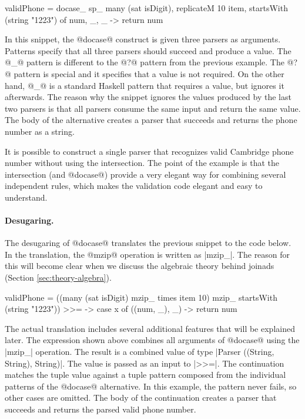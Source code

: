 \documentclass[preprint]{sigplanconf}
\begin{document}
\begin{code}
validPhone = docase_
   sp_ many (sat isDigit), 
       replicateM 10 item,
       startsWith (string "1223") of
  num, _, _ -> return num
\end{code}
In this snippet, the @docase@ construct is given three parsers as arguments. Patterns specify
that all three parsers should succeed and produce a value. The @_@ pattern is different to the
@?@ pattern from the previous example. The @?@ pattern is special and it specifies that a value
is not required. On the other hand, @_@ is a standard Haskell pattern that requires
a value, but ignores it afterwards. The reason why the snippet ignores the values produced by the
last two parsers is that all parsers consume the same input and return the same value.
The body of the alternative creates a parser that succeeds and returns the phone number as
a string.

It is possible to construct a single parser that recognizes valid Cambridge phone number without using
the intersection. The point of the example is that the intersection (and @docase@) provide a
very elegant way for combining several independent rules, which makes the validation code
elegant and easy to understand.

\paragraph{Desugaring.}
The desugaring of @docase@ translates the previous snippet to the code below. In the 
translation, the @mzip@ operation is written as |mzip_|. The reason for this will become clear
when we discuss the algebraic theory behind joinads (Section \ref{sec:theory-algebra}).

\begin{code}
validPhone = 
    ((many (sat isDigit) mzip_ times item 10) 
        mzip_ startsWith (string "1223")) >>= \x ->
            case x of ((num, _), _) -> return num
\end{code}
The actual translation includes several additional features that will be explained later.
The expression shown above combines all arguments of @docase@ using the |mzip_| operation. The 
result is a combined value of type |Parser ((String, String), String)|. The value is passed
as an input to |>>=|. The continuation matches the tuple value against a tuple pattern composed 
from the individual patterns of the @docase@ alternative. In this example, the pattern never fails, 
so other cases are omitted. The body of the continuation creates a parser that succeeds and 
returns the parsed valid phone number.
\end{document}
